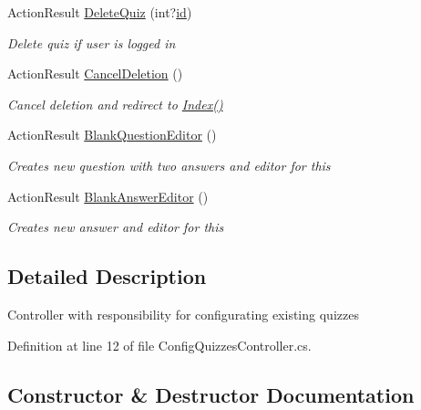 \begin{DoxyCompactItemize}
Action\+Result \hyperlink{class_website_1_1_controllers_1_1_config_quizzes_controller_a132629fe9e314e58b890f91bacbd30b2}{Delete\+Quiz} (int?\hyperlink{_facebook_8js_a9b3d01084d4285e8b0289ee3f959999b}{id})
\begin{DoxyCompactList}\small\item\em Delete quiz if user is logged in \end{DoxyCompactList}\item 
Action\+Result \hyperlink{class_website_1_1_controllers_1_1_config_quizzes_controller_aabac3f775fc586b7d5c17cdcf5bada80}{Cancel\+Deletion} ()
\begin{DoxyCompactList}\small\item\em Cancel deletion and redirect to \hyperlink{class_website_1_1_controllers_1_1_config_quizzes_controller_a6abb226f2d23960edce40ca08d9df013}{Index()} \end{DoxyCompactList}\item 
Action\+Result \hyperlink{class_website_1_1_controllers_1_1_config_quizzes_controller_aed0383db971c7c54a587cbdfaff1dcb1}{Blank\+Question\+Editor} ()
\begin{DoxyCompactList}\small\item\em Creates new question with two answers and editor for this \end{DoxyCompactList}\item 
Action\+Result \hyperlink{class_website_1_1_controllers_1_1_config_quizzes_controller_a4f998720f2064ac7449a5a1fc4dd790b}{Blank\+Answer\+Editor} ()
\begin{DoxyCompactList}\small\item\em Creates new answer and editor for this \end{DoxyCompactList}\end{DoxyCompactItemize}


\subsection{Detailed Description}
Controller with responsibility for configurating existing quizzes 



Definition at line 12 of file Config\+Quizzes\+Controller.\+cs.



\subsection{Constructor \& Destructor Documentation}
\hypertarget{class_website_1_1_controllers_1_1_config_quizzes_controller_a4c887ae9d12800436a571a58218a2e39}{}
